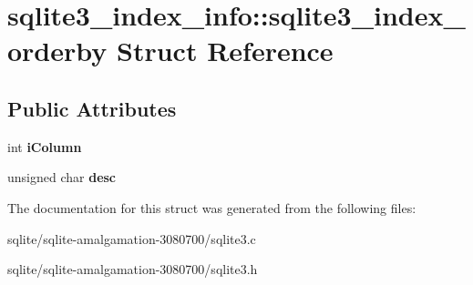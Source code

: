 \hypertarget{structsqlite3__index__info_1_1sqlite3__index__orderby}{\section{sqlite3\+\_\+index\+\_\+info\+:\+:sqlite3\+\_\+index\+\_\+orderby Struct Reference}
\label{structsqlite3__index__info_1_1sqlite3__index__orderby}
}
\subsection*{Public Attributes}
\begin{DoxyCompactItemize}
\item 
\hypertarget{structsqlite3__index__info_1_1sqlite3__index__orderby_a266396085bfda9acef3f13eaa170cd2f}{int {\bfseries i\+Column}}\label{structsqlite3__index__info_1_1sqlite3__index__orderby_a266396085bfda9acef3f13eaa170cd2f}

\item 
\hypertarget{structsqlite3__index__info_1_1sqlite3__index__orderby_a0586d1b5d36221af96aeba8cfc56e9c6}{unsigned char {\bfseries desc}}\label{structsqlite3__index__info_1_1sqlite3__index__orderby_a0586d1b5d36221af96aeba8cfc56e9c6}

\end{DoxyCompactItemize}


The documentation for this struct was generated from the following files\+:\begin{DoxyCompactItemize}
\item 
sqlite/sqlite-\/amalgamation-\/3080700/sqlite3.\+c\item 
sqlite/sqlite-\/amalgamation-\/3080700/sqlite3.\+h\end{DoxyCompactItemize}
